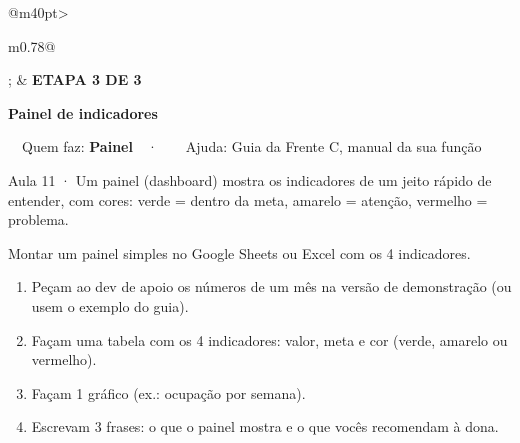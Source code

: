 \documentclass[11pt,a4paper]{article}
\newcommand{\rotulo}[2]{\Needspace{6\baselineskip}\vspace{10pt}%
  \noindent{\color{cor}\normalsize #1}\hspace{6pt}{\footnotesize\bfseries\color{cor}\MakeUppercase{#2}}\par\vspace{2pt}}
\newcommand{\anotacoes}{\par\ifdim\dimexpr\pagegoal-\pagetotal\relax>3.5cm\ifdim\pagegoal<\maxdimen
\begin{tcolorbox}[enhanced,height fill,colback=white,colframe=cor!35,boxrule=0.8pt,arc=8pt,before skip=10pt,left=10pt,top=6pt,
  borderline={0.8pt}{0pt}{cor!35,dashed},frame hidden,
  underlay={\begin{scope}\clip(interior.south west)rectangle(interior.north east);
    \foreach \y in {1,...,40}{\draw[cor!18,line width=0.6pt]([yshift=-\y*0.75cm-0.5cm]interior.north west)--([yshift=-\y*0.75cm-0.5cm]interior.north east);}\end{scope}}]
{\footnotesize\bfseries\color{cor}\faStickyNote\ \ ANOTAÇÕES}
\end{tcolorbox}\fi\fi}
\newif\ifjaanotou
\newcommand{\usarblocofinal}{\par\global\jaanotoufalse
  \ifdim\pagegoal<\maxdimen\ifdim\dimexpr\pagegoal-\pagetotal\relax<\dimexpr\ht\blocofinal+\dp\blocofinal+18pt\relax
    \anotacoes\global\jaanotoutrue\clearpage\fi\fi
  \vspace{10pt}\noindent\usebox{\blocofinal}\par}
\begin{document}
\usarblocofinal
\ifjaanotou\else\anotacoes\fi
\clearpage
\noindent{}
\par\vspace{8pt}
\begin{faixa}[before skip=0pt]
\begin{tabular}{@{}m{40pt}>{\raggedright\arraybackslash}m{0.78\linewidth}@{}}
\tikz\node[circle,fill=white,text=cor,minimum size=36pt,inner sep=0pt]{\Large \faChartBar}; &
{\footnotesize\bfseries ETAPA 3 DE 3}\ \ \ \par\vspace{2pt}
{\fontsize{17}{21}\selectfont\bfseries Painel de indicadores}\par\vspace{3pt}
{\footnotesize\faUser\ \ Quem faz: \textbf{Painel}\ \ ·\ \ \faCompass\ \ Ajuda: Guia da Frente C, manual da sua função}
\end{tabular}
\end{faixa}
\begin{apostila}\vspace{4pt}Aula 11 · Um painel (dashboard) mostra os indicadores de um jeito rápido de entender, com cores: verde = dentro da meta, amarelo = atenção, vermelho = problema.\end{apostila}
\rotulo{\faBullseye}{Objetivo}
{\large Montar um painel simples no Google Sheets ou Excel com os 4 indicadores.}\par
\rotulo{\faShoePrints}{Passo a passo}
\begin{enumerate}
  \item Peçam ao dev de apoio os números de um mês na versão de demonstração (ou usem o exemplo do guia).
  \item Façam uma tabela com os 4 indicadores: valor, meta e cor (verde, amarelo ou vermelho).
  \item Façam 1 gráfico (ex.: ocupação por semana).
  \item Escrevam 3 frases: o que o painel mostra e o que vocês recomendam à dona.
\end{enumerate}
\end{document}
